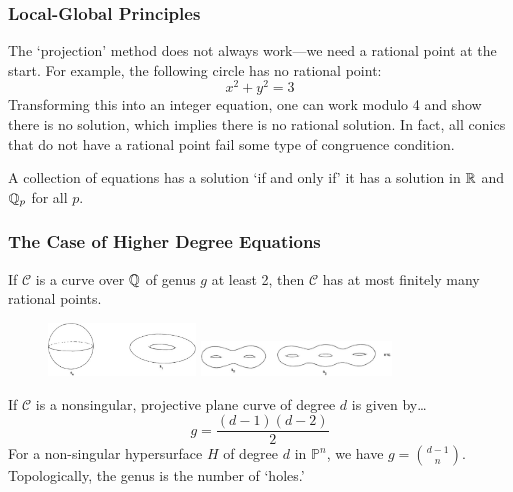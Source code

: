 \begin{frame}[plain] \frametitle{Local-Global Principles}
The `projection' method does not always work---we need a rational point at the start. For example, the following circle has no rational point:
	\[
	x^2 + y^2= 3
	\]
Transforming this into an integer equation, one can work modulo 4 and show there is no solution, which implies there is no rational solution. In fact, all conics that do not have a rational point fail some type of congruence condition. 

\begin{prin}
A collection of equations has a solution `if and only if' it has a solution in $\mathbb{R}$ and $\mathbb{Q}_p$ for all $p$.
\end{prin} 
\end{frame}



\begin{frame}[plain] \frametitle{The Case of Higher Degree Equations} \small

\begin{thm}
If $\mathcal{C}$ is a curve over $\mathbb{Q}$ of genus $g$ at least 2, then $\mathcal{C}$ has at most finitely many rational points. 
\end{thm}

	\begin{figure}[ht]
	\centering
	\includegraphics[width=0.35\textwidth]{images/genus1.png} \quad
	\includegraphics[width=0.45\textwidth]{images/genus2.png}
	\end{figure}

\begin{rem}
If $\mathcal{C}$ is a nonsingular, projective plane curve of degree $d$ is given by\dots
	\[
	g= \dfrac{(d - 1)(d - 2)}{2}
	\]
For a non-singular hypersurface $H$ of degree $d$ in $\mathbb{P}^n$, we have $g= \binom{d - 1}{n}$. Topologically, the genus is the number of `holes.' 
\end{rem}
\end{frame}



